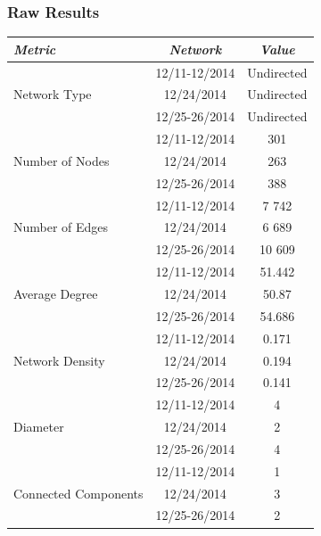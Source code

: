 \documentclass{llncs}
\begin{document}
\subsubsection{Raw Results}
\begin{center}
    \begin{tabular}{ l | c | c }
        \hline
        \textit{Metric} & \textit{Network} & \textit{Value} \\ \hline
        \multirow{3}{*}{Network Type} & 12/11-12/2014 & Undirected \\
                                      & 12/24/2014 & Undirected \\
                                      & 12/25-26/2014 & Undirected \\ \hline
        \multirow{3}{*}{Number of Nodes} & 12/11-12/2014 & 301 \\
                                      & 12/24/2014 & 263 \\
                                      & 12/25-26/2014 & 388 \\ \hline
        \multirow{3}{*}{Number of Edges} & 12/11-12/2014 & 7 742 \\
                                      & 12/24/2014 & 6 689 \\
                                      & 12/25-26/2014 & 10 609 \\ \hline
        \multirow{3}{*}{Average Degree} & 12/11-12/2014 & 51.442 \\
                                      & 12/24/2014 & 50.87 \\
                                      & 12/25-26/2014 & 54.686 \\ \hline
        \multirow{3}{*}{Network Density} & 12/11-12/2014 & 0.171 \\
                                      & 12/24/2014 & 0.194 \\
                                      & 12/25-26/2014 & 0.141 \\ \hline
        \multirow{3}{*}{Diameter} & 12/11-12/2014 & 4 \\
                                      & 12/24/2014 & 2 \\
                                      & 12/25-26/2014 & 4 \\ \hline
        \multirow{3}{*}{Connected Components} & 12/11-12/2014 & 1 \\
                                      & 12/24/2014 & 3 \\
                                      & 12/25-26/2014 & 2 \\ \hline
    \end{tabular}
\end{center}
%
\end{document}
